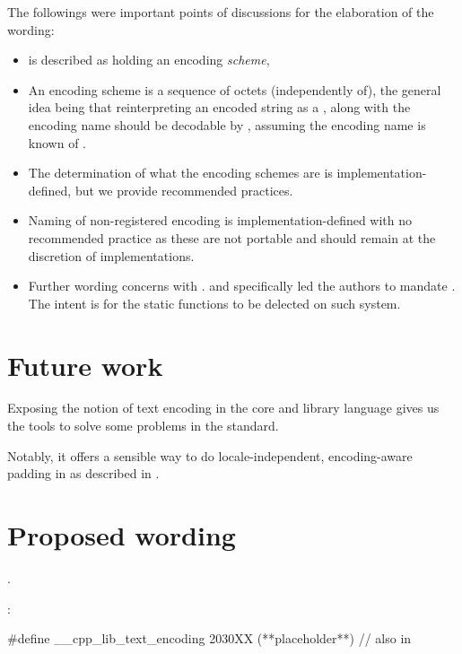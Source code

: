 \documentclass{wg21}
\begin{document}
The followings were important points of discussions for the elaboration of the wording:
\begin{itemize}
\item {} is described as holding an encoding \emph{scheme},
\item An encoding scheme is a sequence of octets (independently of), the general idea being that reinterpreting an encoded string as a , along with the encoding name should be decodable by , assuming the encoding name is known of .
\item The determination of what the encoding schemes are is implementation-defined, but we provide recommended practices.
\item Naming of non-registered encoding is implementation-defined with no recommended practice as these are not portable and should remain at the discretion of implementations.
\item Further wording concerns with . and specifically  led the authors to mandate .
The intent is for the static functions to be delected on such system.
\end{itemize}


\section{Future work}

Exposing the notion of text encoding in the core and library language gives us the tools to solve some problems in the standard.

Notably, it offers a sensible way to do locale-independent, encoding-aware padding in  as described in \cite{P1868}.

\section{Proposed wording}

.

:

\begin{codeblock}
#define __cpp_lib_text_encoding 2030XX (**placeholder**) // also in 
\end{codeblock}
\end{document}
